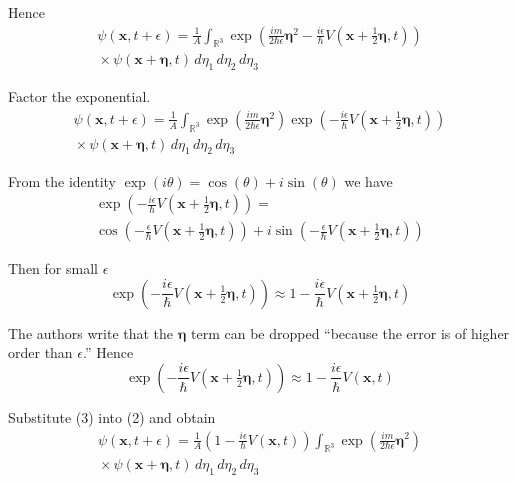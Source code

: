 \documentclass[12pt]{article}
\begin{document}
Hence
\begin{multline*}
\psi(\mathbf{x},t+\epsilon)=
\frac{1}{A}\int_{\mathbb R^3}
\exp\left(
\frac{im}{2\hbar\epsilon}\boldsymbol\eta^2
-\frac{i\epsilon}{\hbar} V\left(\mathbf x+\tfrac{1}{2}\boldsymbol\eta,t\right)
\right)
\\
{}\times\psi(\mathbf{x}+\boldsymbol\eta,t)\,d\eta_1\,d\eta_2\,d\eta_3
\end{multline*}

Factor the exponential.
\begin{multline*}
\psi(\mathbf{x},t+\epsilon)=
\frac{1}{A}\int_{\mathbb R^3}
\exp\left(\frac{im}{2\hbar\epsilon}\boldsymbol\eta^2\right)
\exp\left(-\frac{i\epsilon}{\hbar}V\left(\mathbf x+\tfrac{1}{2}\boldsymbol\eta,t\right)\right)
\\
{}\times\psi(\mathbf{x}+\boldsymbol\eta,t)\,d\eta_1\,d\eta_2\,d\eta_3
\tag{2}
\end{multline*}

From the identity $\exp(i\theta)=\cos(\theta)+i\sin(\theta)$ we have
\begin{multline*}
\exp\left(-\frac{i\epsilon}{\hbar}V\left(\mathbf x+\tfrac{1}{2}\boldsymbol\eta,t\right)\right)=
\\
\cos\left(-\frac{\epsilon}{\hbar}V\left(\mathbf x+\tfrac{1}{2}\boldsymbol\eta,t\right)\right)
+i\sin\left(-\frac{\epsilon}{\hbar}V\left(\mathbf x+\tfrac{1}{2}\boldsymbol\eta,t\right)\right)
\end{multline*}

Then for small $\epsilon$
\begin{equation*}
\exp\left(-\frac{i\epsilon}{\hbar}V\left(\mathbf x+\tfrac{1}{2}\boldsymbol\eta,t\right)\right)\approx
1-\frac{i\epsilon}{\hbar}V\left(\mathbf x+\tfrac{1}{2}\boldsymbol\eta,t\right)
\end{equation*}

The authors write that the $\boldsymbol\eta$ term can be dropped
``because the error is of higher order than $\epsilon$.''
Hence
\begin{equation*}
\exp\left(-\frac{i\epsilon}{\hbar}V\left(\mathbf x+\tfrac{1}{2}\boldsymbol\eta,t\right)\right)\approx
1-\frac{i\epsilon}{\hbar}V\left(\mathbf x,t\right)
\tag{3}
\end{equation*}

Substitute (3) into (2) and obtain
\begin{multline*}
\psi(\mathbf{x},t+\epsilon)=
\frac{1}{A}
\left(1-\frac{i\epsilon}{\hbar}V\left(\mathbf x,t\right)\right)
\int_{\mathbb R^3}
\exp\left(\frac{im}{2\hbar\epsilon}\boldsymbol\eta^2\right)
\\
{}\times\psi(\mathbf x+\boldsymbol\eta,t)\,d\eta_1\,d\eta_2\,d\eta_3
\tag{4}
\end{multline*}
\end{document}
